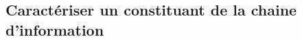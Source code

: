 \subsection{Caractériser un constituant de la chaine d’information}

\renewcommand{\repExo}{../../ExercicesCompetences/A3_AnalyseFonctionnelleStructurelle/A3_06_ChaineInfo}


\renewcommand{\td}{50_BancBalafre}
\graphicspath{{\repStyle/png/}{\repExo/\td/images/}}


\renewcommand{\td}{507_Divers}
\graphicspath{{\repStyle/png/}{\repExo/\td/images/}}
